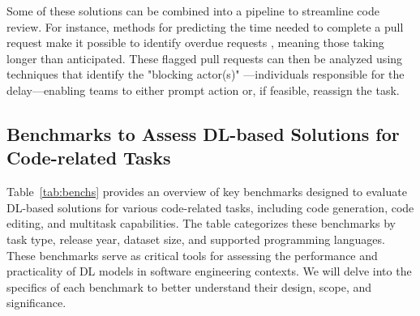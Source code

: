 Some of these solutions can be combined into a pipeline to streamline code
review. For instance, methods for predicting the time needed to complete a pull
request \cite{maddila:esefse2019,shan:esecfse2022} make it possible to identify
overdue requests \cite{shan:esecfse2022}, meaning those taking longer than
anticipated. These flagged pull requests can then be analyzed using techniques
that identify the "blocking actor(s)" \cite{shan:esecfse2022}—individuals
responsible for the delay—enabling teams to either prompt action or, if
feasible, reassign the task.

\subsection{Benchmarks to Assess DL-based Solutions for Code-related Tasks}

Table~\ref{tab:benchs} provides an overview of key benchmarks designed to
evaluate DL-based solutions for various code-related tasks, including code
generation, code editing, and multitask capabilities. The table categorizes
these benchmarks by task type, release year, dataset size, and supported
programming languages. These benchmarks serve as critical tools for assessing
the performance and practicality of DL models in software engineering contexts.
We will delve into the specifics of each benchmark to better understand their
design, scope, and significance.

